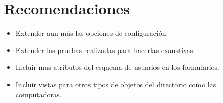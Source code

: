 \section*{Recomendaciones}

\begin{itemize}
  \item Extender aun más las opciones de configuración.
  \item Extender las pruebas realizadas para hacerlas exaustivas.
  \item Incluir mas atributos del esquema de usuarios en los formularios.
  \item Incluir vistas para otros tipos de objetos del directorio como las computadoras.
\end{itemize}
